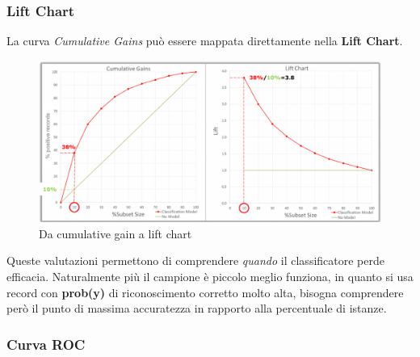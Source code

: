 \subsubsection{Lift Chart}
La curva \textit{Cumulative Gains} può essere mappata direttamente nella \textbf{Lift Chart}.

\begin{figure}[H]
	\centering
	\includegraphics[height=0.45 \linewidth]{classification/pict/lift_chart.png}
	\caption{Da cumulative gain a lift chart}
\end{figure}

Queste valutazioni permettono di comprendere \textit{quando} il classificatore perde efficacia. Naturalmente più il campione è piccolo meglio funziona, in quanto si usa record con \textbf{prob(y)} di riconoscimento corretto molto alta, bisogna comprendere però il punto di massima accuratezza in rapporto alla percentuale di istanze.

\subsubsection{Curva ROC}

